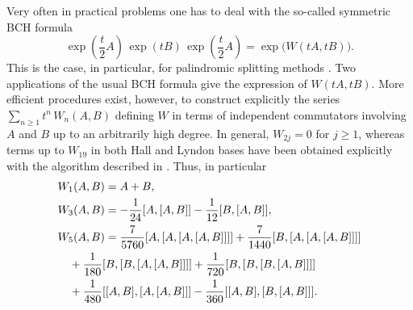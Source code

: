 \documentclass[11pt]{article}
\begin{document}
Very often in practical problems one has to deal with the so-called symmetric BCH formula
\begin{equation}  \label{sBCH1}
  \exp \left(\frac{t}{2} A\right) \, \exp(t B) \, \exp\left(\frac{t}{2} A\right) = \exp \big(W(tA, tB)\big).
\end{equation}
This is the case, in particular, for palindromic splitting methods \cite{blanes24smf}.
Two applications of the usual BCH formula give  the expression of $W(t A, t B)$. More efficient procedures exist, however, 
 to construct explicitly the series $\sum_{n \ge 1} t^n \, W_n(A,B)$ defining $W$ in terms of independent commutators 
involving $A$ and $B$ up to an arbitrarily high degree. In general, $W_{2j} = 0$ for $j \ge 1$, whereas terms up to $W_{19}$
in both Hall and Lyndon bases have been obtained explicitly with the algorithm described in  \cite{casas09aea}. Thus, in particular
\[
\aligned
 &  W_1(A,B) = A + B,  \\
 &  W_3(A,B) =  -\frac{1}{24} [A,[A,B]] - \frac{1}{12} [B,[A,B]],  \\
 & W_5(A,B) = \frac{7}{5760} [A,[A,[A,[A,B]]]] + \frac{7}{1440} [B,[A,[A,[A,B]]]]  \\
 & \quad + \frac{1}{180} [B,[B,[A,[A,B]]]] + \frac{1}{720} [B,[B,[B,[A,B]]]]  \\
 &  \quad  + \frac{1}{480} [[A,B],[A,[A,B]]]  - \frac{1}{360} [[A,B],[B,[A,B]]].  \\
\endaligned   
\]
\end{document}
